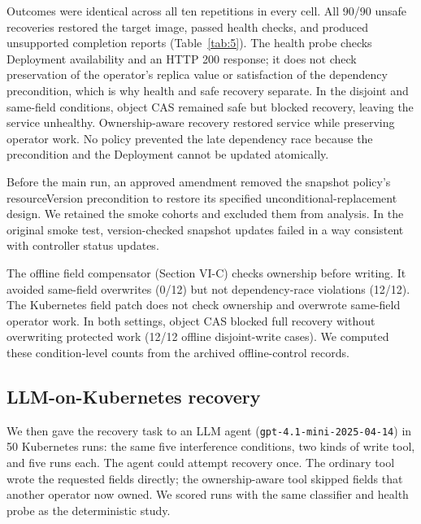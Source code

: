 \documentclass[conference,10pt]{IEEEtran}
\begin{document}
Outcomes were identical across all ten repetitions in every cell. All 90/90 unsafe recoveries restored the target image, passed health checks, and produced unsupported completion reports (Table~\ref{tab:5}). The health probe checks Deployment availability and an HTTP 200 response; it does not check preservation of the operator's replica value or satisfaction of the dependency precondition, which is why health and safe recovery separate. In the disjoint and same\hyp{}field conditions, object CAS remained safe but blocked recovery, leaving the service unhealthy. Ownership\hyp{}aware recovery restored service while preserving operator work. No policy prevented the late dependency race because the precondition and the Deployment cannot be updated atomically.

Before the main run, an approved amendment removed the snapshot policy's resourceVersion precondition to restore its specified unconditional\hyp{}replacement design. We retained the smoke cohorts and excluded them from analysis. In the original smoke test, version\hyp{}checked snapshot updates failed in a way consistent with controller status updates.

The offline field compensator (Section VI\hyp{}C) checks ownership before writing. It avoided same\hyp{}field overwrites (0/12) but not dependency\hyp{}race violations (12/12). The Kubernetes field patch does not check ownership and overwrote same\hyp{}field operator work. In both settings, object CAS blocked full recovery without overwriting protected work (12/12 offline disjoint\hyp{}write cases). We computed these condition\hyp{}level counts from the archived offline\hyp{}control records.

\subsection{LLM-on-Kubernetes recovery}

We then gave the recovery task to an LLM agent (\texttt{\mbox{gpt-}\discretionary{}{}{}\mbox{4.1-}\discretionary{}{}{}\mbox{mini-}\discretionary{}{}{}\mbox{2025-04-14}}) in 50 Kubernetes runs: the same five interference conditions, two kinds of write tool, and five runs each. The agent could attempt recovery once. The ordinary tool wrote the requested fields directly; the ownership\hyp{}aware tool skipped fields that another operator now owned. We scored runs with the same classifier and health probe as the deterministic study.
\end{document}

